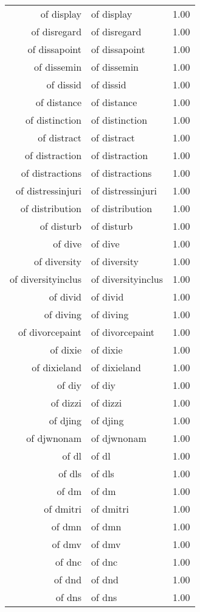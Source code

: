 \begin{table}[ht]
\begin{tabular}{rlr}
  of display & of display & 1.00 \\ 
  of disregard & of disregard & 1.00 \\ 
  of dissapoint & of dissapoint & 1.00 \\ 
  of dissemin & of dissemin & 1.00 \\ 
  of dissid & of dissid & 1.00 \\ 
  of distance & of distance & 1.00 \\ 
  of distinction & of distinction & 1.00 \\ 
  of distract & of distract & 1.00 \\ 
  of distraction & of distraction & 1.00 \\ 
  of distractions & of distractions & 1.00 \\ 
  of distressinjuri & of distressinjuri & 1.00 \\ 
  of distribution & of distribution & 1.00 \\ 
  of disturb & of disturb & 1.00 \\ 
  of dive & of dive & 1.00 \\ 
  of diversity & of diversity & 1.00 \\ 
  of diversityinclus & of diversityinclus & 1.00 \\ 
  of divid & of divid & 1.00 \\ 
  of diving & of diving & 1.00 \\ 
  of divorcepaint & of divorcepaint & 1.00 \\ 
  of dixie & of dixie & 1.00 \\ 
  of dixieland & of dixieland & 1.00 \\ 
  of diy & of diy & 1.00 \\ 
  of dizzi & of dizzi & 1.00 \\ 
  of djing & of djing & 1.00 \\ 
  of djwnonam & of djwnonam & 1.00 \\ 
  of dl & of dl & 1.00 \\ 
  of dls & of dls & 1.00 \\ 
  of dm & of dm & 1.00 \\ 
  of dmitri & of dmitri & 1.00 \\ 
  of dmn & of dmn & 1.00 \\ 
  of dmv & of dmv & 1.00 \\ 
  of dnc & of dnc & 1.00 \\ 
  of dnd & of dnd & 1.00 \\ 
  of dns & of dns & 1.00 \\ 

\end{tabular}
\end{table}
